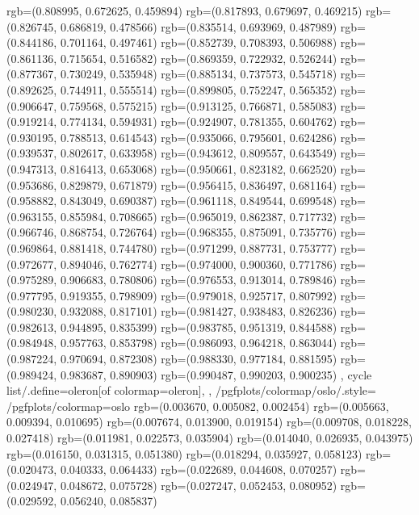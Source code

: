{{{					rgb=(0.808995, 0.672625, 0.459894)
					rgb=(0.817893, 0.679697, 0.469215)
					rgb=(0.826745, 0.686819, 0.478566)
					rgb=(0.835514, 0.693969, 0.487989)
					rgb=(0.844186, 0.701164, 0.497461)
					rgb=(0.852739, 0.708393, 0.506988)
					rgb=(0.861136, 0.715654, 0.516582)
					rgb=(0.869359, 0.722932, 0.526244)
					rgb=(0.877367, 0.730249, 0.535948)
					rgb=(0.885134, 0.737573, 0.545718)
					rgb=(0.892625, 0.744911, 0.555514)
					rgb=(0.899805, 0.752247, 0.565352)
					rgb=(0.906647, 0.759568, 0.575215)
					rgb=(0.913125, 0.766871, 0.585083)
					rgb=(0.919214, 0.774134, 0.594931)
					rgb=(0.924907, 0.781355, 0.604762)
					rgb=(0.930195, 0.788513, 0.614543)
					rgb=(0.935066, 0.795601, 0.624286)
					rgb=(0.939537, 0.802617, 0.633958)
					rgb=(0.943612, 0.809557, 0.643549)
					rgb=(0.947313, 0.816413, 0.653068)
					rgb=(0.950661, 0.823182, 0.662520)
					rgb=(0.953686, 0.829879, 0.671879)
					rgb=(0.956415, 0.836497, 0.681164)
					rgb=(0.958882, 0.843049, 0.690387)
					rgb=(0.961118, 0.849544, 0.699548)
					rgb=(0.963155, 0.855984, 0.708665)
					rgb=(0.965019, 0.862387, 0.717732)
					rgb=(0.966746, 0.868754, 0.726764)
					rgb=(0.968355, 0.875091, 0.735776)
					rgb=(0.969864, 0.881418, 0.744780)
					rgb=(0.971299, 0.887731, 0.753777)
					rgb=(0.972677, 0.894046, 0.762774)
					rgb=(0.974000, 0.900360, 0.771786)
					rgb=(0.975289, 0.906683, 0.780806)
					rgb=(0.976553, 0.913014, 0.789846)
					rgb=(0.977795, 0.919355, 0.798909)
					rgb=(0.979018, 0.925717, 0.807992)
					rgb=(0.980230, 0.932088, 0.817101)
					rgb=(0.981427, 0.938483, 0.826236)
					rgb=(0.982613, 0.944895, 0.835399)
					rgb=(0.983785, 0.951319, 0.844588)
					rgb=(0.984948, 0.957763, 0.853798)
					rgb=(0.986093, 0.964218, 0.863044)
					rgb=(0.987224, 0.970694, 0.872308)
					rgb=(0.988330, 0.977184, 0.881595)
					rgb=(0.989424, 0.983687, 0.890903)
					rgb=(0.990487, 0.990203, 0.900235)
			},
		cycle list/.define={oleron}{[of colormap=oleron]},
		},
		/pgfplots/colormap/oslo/.style={
			/pgfplots/colormap={oslo}{%
					rgb=(0.003670, 0.005082, 0.002454)
					rgb=(0.005663, 0.009394, 0.010695)
					rgb=(0.007674, 0.013900, 0.019154)
					rgb=(0.009708, 0.018228, 0.027418)
					rgb=(0.011981, 0.022573, 0.035904)
					rgb=(0.014040, 0.026935, 0.043975)
					rgb=(0.016150, 0.031315, 0.051380)
					rgb=(0.018294, 0.035927, 0.058123)
					rgb=(0.020473, 0.040333, 0.064433)
					rgb=(0.022689, 0.044608, 0.070257)
					rgb=(0.024947, 0.048672, 0.075728)
					rgb=(0.027247, 0.052453, 0.080952)
					rgb=(0.029592, 0.056240, 0.085837)
}}}
